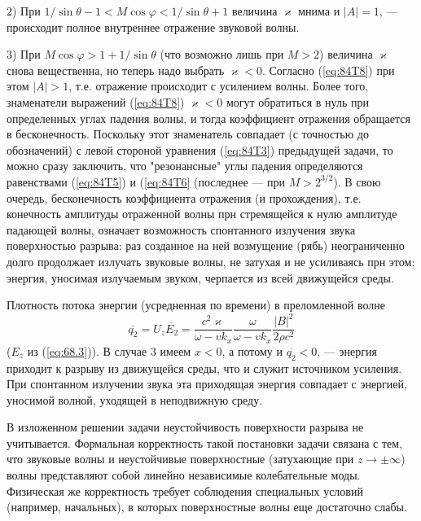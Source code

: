 2) При $ 1/\sin\theta-1<M\cos\varphi<1/\sin\theta+1 $ величина $\varkappa$ мнима и $|A|=1$, --- происходит полное внутреннее отражение звуковой волны.

3) При $ M\cos\varphi>1+1/\sin\theta $ (что возможно лишь при $ M>2 $) величина $\varkappa$ снова вещественна, но теперь надо выбрать $ \varkappa<0 $.
Согласно (\ref{eq:84T8}) при этом $ |A|>1 $, т.е. отражение происходит с усилением волны.
Более того, знаменатели выражений (\ref{eq:84T8}) $ \varkappa<0 $ могут обратиться в нуль при определенных углах падения волны, и тогда коэффициент отражения обращается в бесконечность.
Поскольку этот знаменатель совпадает (с точностью до обозначений) с левой стороной уравнения (\ref{eq:84T3}) предыдущей задачи, то можно сразу заключить, что "резонансные" углы падения определяются равенствами (\ref{eq:84T5}) и (\ref{eq:84T6} (последнее --- при $M>2^{3/2}$).
В свою очередь, бесконечность коэффициента отражения (и прохождения), т.е. конечность амплитуды отраженной волны прн стремящейся к нулю амплитуде падающей волны, означает возможность спонтанного излучения звука поверхностью разрыва: раз созданное на ней возмущение (рябь) неограниченно долго продолжает излучать звуковые волны, не затухая и не усиливаясь прн этом; энергия, уносимая излучаемым звуком, черпается из всей движущейся среды.

Плотность потока энергии (усредненная по времени) в преломленной волне
\[
    \overline{q_2} = U_z\overline{E_2}=\frac{c^2\varkappa}{\omega-vk_x}
    \frac{\omega}{\omega-vk_x}\frac{{|B|}^2}{2\rho c^2}
\]
($E_z$ из (\ref{eq:68.3})).
В случае $3$ имеем $x<0$, а потому и $\overline{q_2}<0$, --- энергия приходит к разрыву из движущейся среды, что и служит источником усиления.
При спонтанном излучении звука эта приходящая энергия совпадает с энергией, уносимой волной, уходящей в неподвижную среду.

В изложенном решении задачи неустойчивость поверхности разрыва не учитывается.
Формальная корректность такой постановки задачи связана с тем, что звуковые волны и неустойчивые поверхностные (затухающие при $z\rightarrow\pm\infty$) волны представляют собой линейно независимые колебательные моды.
Физическая же корректность требует соблюдения специальных условий (например, начальных), в которых поверхностные волны еще достаточно слабы.

\begin{comment}
\end{comment}

